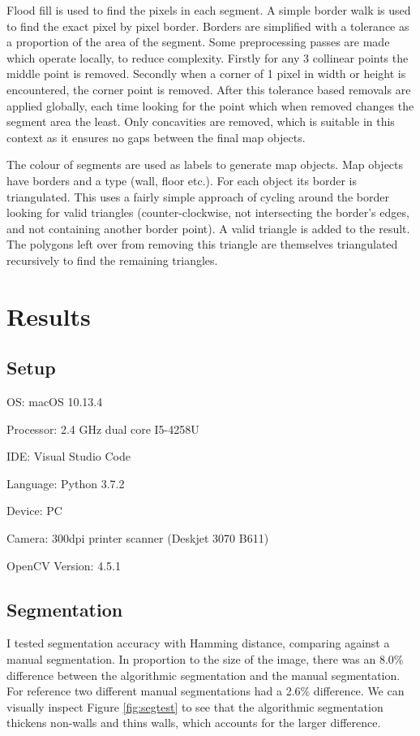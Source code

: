 \documentclass{IEEEtran}
\begin{document}
Flood fill is used to find the pixels in each segment. A simple border walk is used to find the exact pixel by pixel border. Borders are simplified with a tolerance as a proportion of the area of the segment. Some preprocessing passes are made which operate locally, to reduce complexity. Firstly for any 3 collinear points the middle point is removed. Secondly when a corner of 1 pixel in width or height is encountered, the corner point is removed. After this tolerance based removals are applied globally, each time looking for the point which when removed changes the segment area the least. Only concavities are removed, which is suitable in this context as it ensures no gaps between the final map objects.

The colour of segments are used as labels to generate map objects. Map objects have borders and a type (wall, floor etc.). For each object its border is triangulated. This uses a fairly simple approach of cycling around the border looking for valid triangles (counter-clockwise, not intersecting the border's edges, and not containing another border point). A valid triangle is added to the result. The polygons left over from removing this triangle are themselves triangulated recursively to find the remaining triangles. 


\section{Results}

\subsection{Setup}
OS: macOS 10.13.4

Processor: 2.4 GHz dual core I5-4258U

IDE: Visual Studio Code

Language: Python 3.7.2

Device: PC

Camera: 300dpi printer scanner (Deskjet 3070 B611)

OpenCV Version: 4.5.1

\subsection{Segmentation}

I tested segmentation accuracy with Hamming distance, comparing against a manual segmentation. In proportion to the size of the image, there was an 8.0\% difference between the algorithmic segmentation and the manual segmentation. For reference two different manual segmentations had a 2.6\% difference. We can visually inspect Figure \ref{fig:segtest} to see that the algorithmic segmentation thickens non-walls and thins walls, which accounts for the larger difference.
\end{document}
